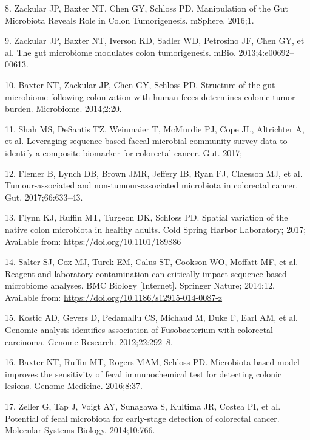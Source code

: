 \documentclass[12pt,]{article}
\begin{document}
\hypertarget{ref-zackular_manipulation_2016}{}
8. Zackular JP, Baxter NT, Chen GY, Schloss PD. Manipulation of the Gut
Microbiota Reveals Role in Colon Tumorigenesis. mSphere. 2016;1.

\hypertarget{ref-zackular_gut_2013}{}
9. Zackular JP, Baxter NT, Iverson KD, Sadler WD, Petrosino JF, Chen GY,
et al. The gut microbiome modulates colon tumorigenesis. mBio.
2013;4:e00692--00613.

\hypertarget{ref-baxter_structure_2014}{}
10. Baxter NT, Zackular JP, Chen GY, Schloss PD. Structure of the gut
microbiome following colonization with human feces determines colonic
tumor burden. Microbiome. 2014;2:20.

\hypertarget{ref-shah_leveraging_2017}{}
11. Shah MS, DeSantis TZ, Weinmaier T, McMurdie PJ, Cope JL, Altrichter
A, et al. Leveraging sequence-based faecal microbial community survey
data to identify a composite biomarker for colorectal cancer. Gut. 2017;

\hypertarget{ref-flemer_tumour-associated_2017}{}
12. Flemer B, Lynch DB, Brown JMR, Jeffery IB, Ryan FJ, Claesson MJ, et
al. Tumour-associated and non-tumour-associated microbiota in colorectal
cancer. Gut. 2017;66:633--43.

\hypertarget{ref-Flynn_preprint_2017}{}
13. Flynn KJ, Ruffin MT, Turgeon DK, Schloss PD. Spatial variation of
the native colon microbiota in healthy adults. Cold Spring Harbor
Laboratory; 2017; Available from: \url{https://doi.org/10.1101/189886}

\hypertarget{ref-Salter_contamination_2014}{}
14. Salter SJ, Cox MJ, Turek EM, Calus ST, Cookson WO, Moffatt MF, et
al. Reagent and laboratory contamination can critically impact
sequence-based microbiome analyses. BMC Biology {[}Internet{]}. Springer
Nature; 2014;12. Available from:
\url{https://doi.org/10.1186/s12915-014-0087-z}

\hypertarget{ref-kostic_genomic_2012}{}
15. Kostic AD, Gevers D, Pedamallu CS, Michaud M, Duke F, Earl AM, et
al. Genomic analysis identifies association of Fusobacterium with
colorectal carcinoma. Genome Research. 2012;22:292--8.

\hypertarget{ref-baxter_microbiota-based_2016}{}
16. Baxter NT, Ruffin MT, Rogers MAM, Schloss PD. Microbiota-based model
improves the sensitivity of fecal immunochemical test for detecting
colonic lesions. Genome Medicine. 2016;8:37.

\hypertarget{ref-zeller_potential_2014}{}
17. Zeller G, Tap J, Voigt AY, Sunagawa S, Kultima JR, Costea PI, et al.
Potential of fecal microbiota for early-stage detection of colorectal
cancer. Molecular Systems Biology. 2014;10:766.
\end{document}
